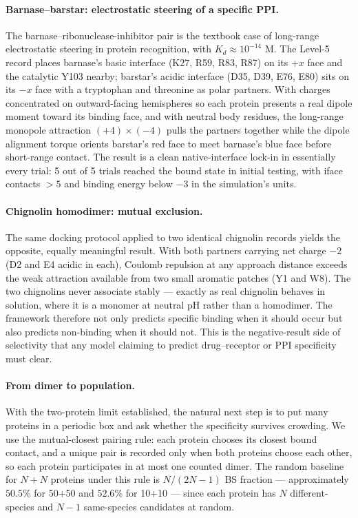 \documentclass[11pt]{article}
\begin{document}
\paragraph{Barnase--barstar: electrostatic steering of a specific PPI.}
The barnase--ribonuclease-inhibitor pair is the textbook case of long-range electrostatic steering in protein recognition, with $K_d \approx 10^{-14}$ M. The Level-5 record places barnase's basic interface (K27, R59, R83, R87) on its $+x$ face and the catalytic Y103 nearby; barstar's acidic interface (D35, D39, E76, E80) sits on its $-x$ face with a tryptophan and threonine as polar partners. With charges concentrated on outward-facing hemispheres so each protein presents a real dipole moment toward its binding face, and with neutral body residues, the long-range monopole attraction $(+4) \times (-4)$ pulls the partners together while the dipole alignment torque orients barstar's red face to meet barnase's blue face before short-range contact. The result is a clean native-interface lock-in in essentially every trial: 5 out of 5 trials reached the bound state in initial testing, with iface contacts $>5$ and binding energy below $-3$ in the simulation's units.

\paragraph{Chignolin homodimer: mutual exclusion.}
The same docking protocol applied to two identical chignolin records yields the opposite, equally meaningful result. With both partners carrying net charge $-2$ (D2 and E4 acidic in each), Coulomb repulsion at any approach distance exceeds the weak attraction available from two small aromatic patches (Y1 and W8). The two chignolins never associate stably --- exactly as real chignolin behaves in solution, where it is a monomer at neutral pH rather than a homodimer. The framework therefore not only predicts specific binding when it should occur but also predicts non-binding when it should not. This is the negative-result side of selectivity that any model claiming to predict drug--receptor or PPI specificity must clear.

\paragraph{From dimer to population.}
With the two-protein limit established, the natural next step is to put many proteins in a periodic box and ask whether the specificity survives crowding. We use the mutual-closest pairing rule: each protein chooses its closest bound contact, and a unique pair is recorded only when both proteins choose each other, so each protein participates in at most one counted dimer. The random baseline for $N{+}N$ proteins under this rule is $N/(2N{-}1)$ BS fraction --- approximately $50.5\%$ for 50+50 and $52.6\%$ for 10+10 --- since each protein has $N$ different-species and $N{-}1$ same-species candidates at random.
\end{document}
